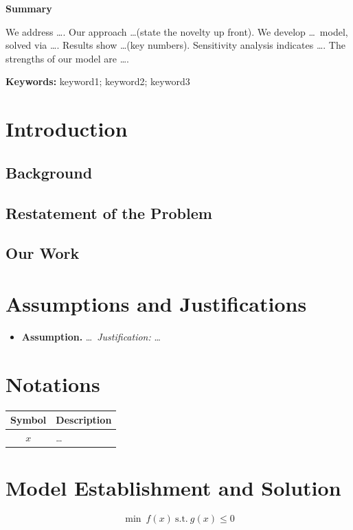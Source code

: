 \documentclass[12pt]{article}
\begin{document}
\begin{center}\Large\textbf{Summary}\end{center}
\thispagestyle{fancy}
\noindent We address \dots. Our approach \dots (state the novelty up front).
We develop \dots\ model, solved via \dots. Results show \dots (key numbers).
Sensitivity analysis indicates \dots. The strengths of our model are \dots.

\vspace{1em}
\noindent\textbf{Keywords:} keyword1; keyword2; keyword3
\newpage

\tableofcontents
\newpage

\section{Introduction}
\subsection{Background}
\subsection{Restatement of the Problem}
\subsection{Our Work}

\section{Assumptions and Justifications}
\begin{itemize}
  \item \textbf{Assumption.} \dots\ \emph{Justification:} \dots
\end{itemize}

\section{Notations}
\begin{table}[H]\centering
\begin{tabular}{cl}
\toprule Symbol & Description \\ \midrule
$x$ & \dots \\ \bottomrule
\end{tabular}
\end{table}

\section{Model Establishment and Solution}
\begin{equation} \min\ f(x)\ \text{s.t.}\ g(x)\le 0 \end{equation}
\end{document}
